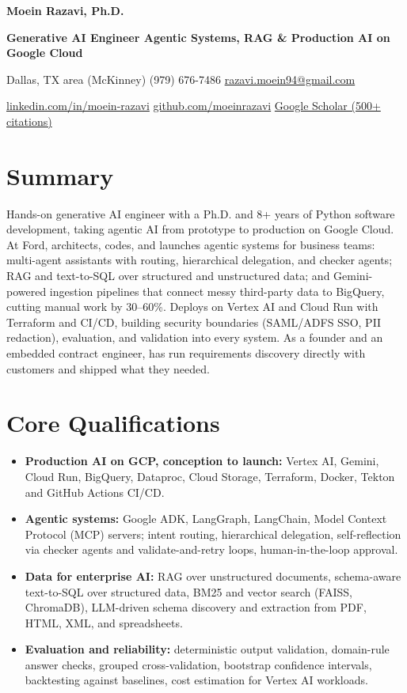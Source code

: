 \documentclass[letterpaper,10pt]{article}
\begin{document}
\fontsize{10}{12.1}\selectfont

{\centering
{\fontsize{20}{24}\selectfont\bfseries\color{ink} Moein Razavi, Ph.D.}\par\vspace{2pt}
{\fontsize{11}{13}\selectfont\bfseries Generative AI Engineer \textbar{} Agentic Systems, RAG \& Production AI on Google Cloud}\par\vspace{2pt}
Dallas, TX area (McKinney) \textbar{} (979) 676-7486 \textbar{} \href{mailto:razavi.moein94@gmail.com}{razavi.moein94@gmail.com}\par
\href{https://linkedin.com/in/moein-razavi}{linkedin.com/in/moein-razavi} \textbar{} \href{https://github.com/moeinrazavi}{github.com/moeinrazavi} \textbar{} \href{https://scholar.google.com/citations?hl=en&user=t2fdg1YAAAAJ}{Google Scholar (500+ citations)}\par
}

\section{Summary}
Hands-on generative AI engineer with a Ph.D. and 8+ years of Python software development, taking agentic AI from prototype to production on Google Cloud. At Ford, architects, codes, and launches agentic systems for business teams: multi-agent assistants with routing, hierarchical delegation, and checker agents; RAG and text-to-SQL over structured and unstructured data; and Gemini-powered ingestion pipelines that connect messy third-party data to BigQuery, cutting manual work by 30--60\%. Deploys on Vertex AI and Cloud Run with Terraform and CI/CD, building security boundaries (SAML/ADFS SSO, PII redaction), evaluation, and validation into every system. As a founder and an embedded contract engineer, has run requirements discovery directly with customers and shipped what they needed.

\section{Core Qualifications}
\begin{itemize}
\item \textbf{Production AI on GCP, conception to launch:} Vertex AI, Gemini, Cloud Run, BigQuery, Dataproc, Cloud Storage, Terraform, Docker, Tekton and GitHub Actions CI/CD.
\item \textbf{Agentic systems:} Google ADK, LangGraph, LangChain, Model Context Protocol (MCP) servers; intent routing, hierarchical delegation, self-reflection via checker agents and validate-and-retry loops, human-in-the-loop approval.
\item \textbf{Data for enterprise AI:} RAG over unstructured documents, schema-aware text-to-SQL over structured data, BM25 and vector search (FAISS, ChromaDB), LLM-driven schema discovery and extraction from PDF, HTML, XML, and spreadsheets.
\item \textbf{Evaluation and reliability:} deterministic output validation, domain-rule answer checks, grouped cross-validation, bootstrap confidence intervals, backtesting against baselines, cost estimation for Vertex AI workloads.
\end{itemize}
\end{document}
